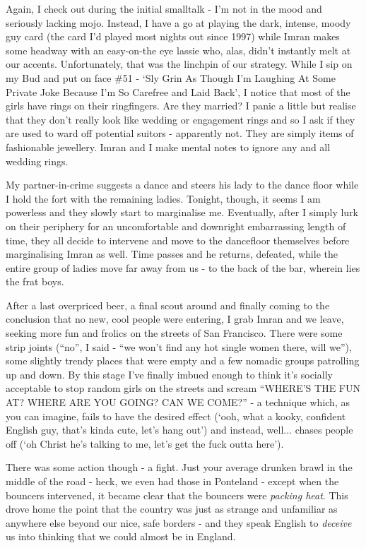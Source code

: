 \documentclass[a5paper,titlepage,11pt,draft]{book}
\begin{document}
Again, I check out during the initial smalltalk - I'm not in the mood and seriously lacking mojo.  Instead, I have a go at playing the dark, intense, moody guy card (the card I'd played most nights out since 1997) while Imran makes some headway with an easy-on-the eye lassie who, alas, didn't instantly melt at our accents.  Unfortunately, that was the linchpin of our strategy.  While I sip on my Bud and put on face \#51 - `Sly Grin As Though I'm Laughing At Some Private Joke Because I'm So Carefree and Laid Back', I notice that most of the girls have rings on their ringfingers.  Are they married?  I panic a little but realise that they don't really look like wedding or engagement rings and so I ask if they are used to ward off potential suitors - apparently not.  They are simply items of fashionable jewellery.  Imran and I make mental notes to ignore any and all wedding rings.

My partner-in-crime suggests a dance and steers his lady to the dance floor while I hold the fort with the remaining ladies.  Tonight, though, it seems I am powerless and they slowly start to marginalise me.  Eventually, after I simply lurk on their periphery for an uncomfortable and downright embarrassing length of time, they all decide to intervene and move to the dancefloor themselves before marginalising Imran as well.  Time passes and he returns, defeated, while the entire group of ladies move far away from us - to the back of the bar, wherein lies the frat boys.

After a last overpriced beer, a final scout around and finally coming to the conclusion that no new, cool people were entering, I grab Imran and we leave, seeking more fun and frolics on the streets of San Francisco.  There were some strip joints (``no'', I said - ``we won't find any hot single women there, will we''), some slightly trendy places that were empty and a few nomadic groups patrolling up and down.  By this stage I've finally imbued enough to think it's socially acceptable to stop random girls on the streets and scream ``WHERE'S THE FUN AT?  WHERE ARE YOU GOING?  CAN WE COME?'' - a technique which, as you can imagine, fails to have the desired effect (`ooh, what a kooky, confident English guy, that's kinda cute, let's hang out') and instead, well... chases people off (`oh Christ he's talking to me, let's get the fuck outta here').

There was some action though - a fight.  Just your average drunken brawl in the middle of the road - heck, we even had those in Ponteland - except when the bouncers intervened, it became clear that the bouncers were \emph{packing heat}.  This drove home the point that the country was just as strange and unfamiliar as anywhere else beyond our nice, safe borders - and they speak English to \emph{deceive} us into thinking that we could almost be in England.
\end{document}
